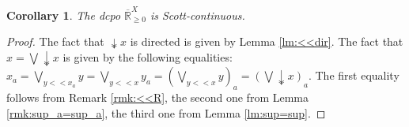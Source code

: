 \documentclass[submission,copyright,creativecommons]{eptcs}
\newtheorem{Corollary}[theorem]{Corollary}
\newcommand{\R}{\mathbb{R}}
\begin{document}
\begin{Corollary}
 The dcpo $\overline{\R}_{\geq 0}^X$ is Scott-continuous.
\end{Corollary}
\begin{proof}
 The fact that $\twoheaddownarrow x$ is directed is given by Lemma \ref{lm:<<dir}. The fact that $x=\bigvee \twoheaddownarrow x$ is given by the following equalities:
 $x_a=\bigvee\limits_{y<<x_a} y = \bigvee\limits_{y<<x} y_a = \left(\bigvee\limits_{y<<x} y\right)_a=\left(\bigvee \twoheaddownarrow x\right)_a$.
 The first equality follows from Remark \ref{rmk:<<R}, the second one from Lemma \ref{rmk:sup_a=sup_a}, the third one from Lemma \ref{lm:sup=sup}.
\end{proof}



\end{document}
